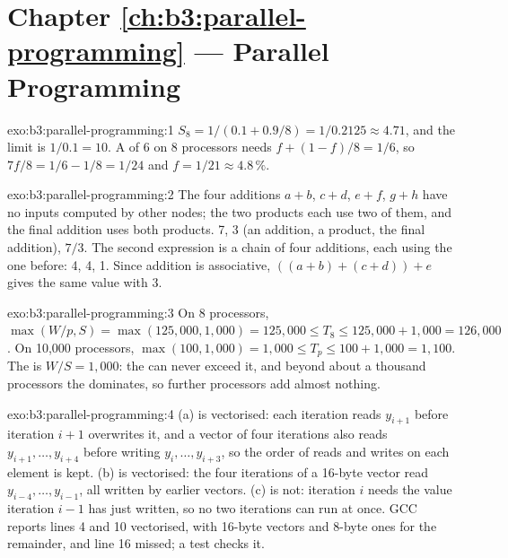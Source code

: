 \section*{Chapter \ref{ch:b3:parallel-programming} --- Parallel Programming}

\begin{solution}{exo:b3:parallel-programming:1}
$S_8 = 1 / (0.1 + 0.9/8) = 1/0.2125 \approx 4.71$, and the limit is $1/0.1 = 10$. A  of 6 on 8 processors needs $f + (1 - f)/8 = 1/6$, so $7f/8 = 1/6 - 1/8 = 1/24$ and $f = 1/21 \approx 4.8\,\%$.
\end{solution}

\begin{solution}{exo:b3:parallel-programming:2}
The four additions $a + b$, $c + d$, $e + f$, $g + h$ have no inputs computed by other nodes; the two products each use two of them, and the final addition uses both products.  7,  3 (an addition, a product, the final addition),  $7/3$. The second expression is a chain of four additions, each using the one before:  4,  4,  1. Since addition is associative, $((a + b) + (c + d)) + e$ gives the same value with  3.
\end{solution}

\begin{solution}{exo:b3:parallel-programming:3}
On 8 processors, $\max(W/p, S) = \max(125{,}000, 1{,}000) = 125{,}000 \le T_8 \le 125{,}000 + 1{,}000 = 126{,}000$. On 10,000 processors, $\max(100, 1{,}000) = 1{,}000 \le T_p \le 100 + 1{,}000 = 1{,}100$. The  is $W/S = 1{,}000$: the  can never exceed it, and beyond about a thousand processors the  dominates, so further processors add almost nothing.
\end{solution}

\begin{solution}{exo:b3:parallel-programming:4}
(a) is vectorised: each iteration reads $y_{i+1}$ before iteration $i + 1$ overwrites it, and a vector of four iterations also reads $y_{i+1}, \ldots, y_{i+4}$ before writing $y_i, \ldots, y_{i+3}$, so the order of reads and writes on each element is kept. (b) is vectorised: the four iterations of a 16-byte vector read $y_{i-4}, \ldots, y_{i-1}$, all written by earlier vectors. (c) is not: iteration $i$ needs the value iteration $i - 1$ has just written, so no two iterations can run at once. GCC reports lines 4 and 10 vectorised, with 16-byte vectors and 8-byte ones for the remainder, and line 16 missed; a test checks it.
\end{solution}

